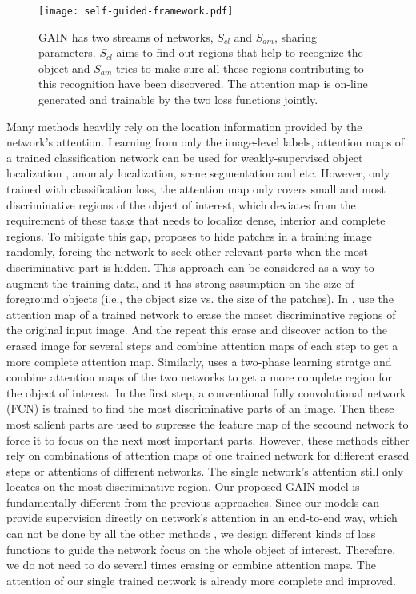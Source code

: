 \documentclass[10pt,twocolumn,letterpaper]{article}
\begin{document}
\begin{figure*}%
\centering
\texttt{[image: self-guided-framework.pdf]} %
\caption{GAIN has two streams of networks, ${S_{cl}}$ and ${S_{am}}$, sharing parameters. ${S_{cl}}$ aims to find out regions that help to recognize the object and ${S_{am}}$ tries to make sure all these regions contributing to this recognition have been discovered. The attention map is on-line generated and trainable by the two loss functions jointly.}
\label{fig:self_supervised} 
\end{figure*} 


Many methods heavlily rely on the location information provided by the network's attention. Learning from only the image-level labels, attention maps of a trained classification network can be used for weakly-supervised object localization \cite{zhou2016learning,oquab2015object}, anomaly localization, scene segmentation \cite{kolesnikov2016seed} and etc. However, only trained with classification loss, the attention map only covers small and most discriminative regions of the object of interest, which deviates from the requirement of these tasks that needs to localize dense, interior and complete regions. To mitigate this gap, \cite{singh2017hide} proposes to hide patches in a training image randomly, forcing the network to seek other relevant parts when the most discriminative part is hidden. This approach can be considered as a way to augment the training data, and it has strong assumption on the size of foreground objects (i.e., the object size vs. the size of the patches). In \cite{wei2017object}, use the attention map of a trained network to erase the moset discriminative regions of the original input image. And the repeat this erase and discover action to the erased image for several steps and combine attention maps of each step to get a more complete attention map. Similarly, \cite{kim2017two} uses a two-phase learning stratge and combine attention maps of the two networks to get a more complete region for the object of interest. In the first step, a conventional fully convolutional network (FCN) \cite{long2015fully} is trained to find the most discriminative parts of an image. Then these most salient parts are used to supresse the feature map of the secound network to force it to focus on the next most important parts. However, these methods either rely on combinations of attention maps of one trained network for different erased steps or attentions of different networks. The single network's attention still only locates on the most discriminative region. Our proposed GAIN model is fundamentally different from the previous approaches. Since our models can provide supervision directly on network's attention in an end-to-end way, which can not be done by all the other methods \cite{grad-cam,zhou2016learning,wei2017object,zhang2016top,singh2017hide,kim2017two}, we design different kinds of loss functions to guide the network focus on the whole object of interest. Therefore, we do not need to do several times erasing or combine attention maps. The attention of our single trained network is already more complete and improved.
\end{document}
